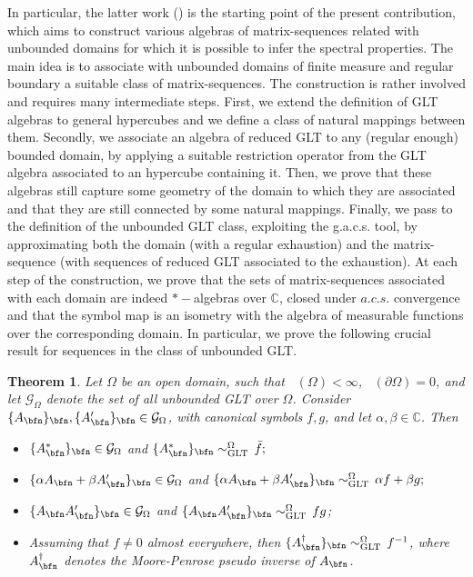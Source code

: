 \documentclass{amsart}
\newtheorem{thm}{Theorem}[section]
\DeclareMathOperator{\Ld}{\mathcal{L}^d}
\begin{document}
In particular, the latter work (\cite{gacs}) is the starting point of the present contribution, which aims to construct various algebras of matrix-sequences related with unbounded domains for which it is possible to infer the spectral properties. The main idea is to associate with unbounded domains of finite measure and regular boundary a suitable class of matrix-sequences. The construction is rather involved and requires many intermediate steps. First, we extend the definition of GLT algebras to general hypercubes and we define a class of natural mappings between them. Secondly, we associate an algebra of reduced GLT to any (regular enough) bounded domain, by applying a suitable restriction operator from the GLT algebra associated to an hypercube containing it. Then, we prove that these algebras still capture some geometry of the domain to which they are associated and that they are still connected by some natural mappings. Finally, we pass to the definition of the unbounded GLT class, exploiting the g.a.c.s. tool, by approximating both the domain (with a regular exhaustion) and the matrix-sequence (with sequences of reduced GLT associated to the exhaustion). 
At each step of the construction, we prove that the sets of matrix-sequences associated with each domain are indeed $*-$algebras over $\mathbb{C}$, closed under $a.c.s.$ convergence and that the symbol map is an isometry with the algebra of measurable functions over the corresponding domain.
In particular, we prove the following crucial result for sequences in the class of unbounded GLT.
\begin{thm}\label{main_thm_intro}
    Let $\Omega$ be an open domain, such that $\Ld(\Omega)<\infty$, $\Ld(\partial\Omega)=0$, and let $\mathcal{G}_{\Omega}$ denote the set of all unbounded GLT over $\Omega$. Consider $\{A_\bfn\}_\bfn,\{A'_\bfn\}_\bfn\in\mathcal{G}_{\Omega}$, with canonical symbols $f,g$, and let $\alpha,\beta\in\mathbb{C}$. Then
\begin{itemize}
    \item[(i)]\label{main_item_i} $\{A_\bfn^*\}_\bfn\in\mathcal{G}_\Omega$ and $ \{A^*_{\bfn}\}_{\bfn}\sim_{\mathrm{GLT}}^{\Omega}\,\bar{f};$
    \item[(ii)]\label{main_item_ii} $\{\alpha A_\bfn+\beta A'_\bfn\}_\bfn\in\mathcal{G}_\Omega$ and $\{\alpha A_{\bfn}+\beta A'_\bfn\}_{\bfn}\sim_{\mathrm{GLT}}^{\Omega}\,\alpha f+\beta g;$
    \item[(iii)]\label{main_item_iii} $\{A_\bfn A'_\bfn\}_\bfn\in\mathcal{G}_\Omega$ and $\{A_{\bfn} A'_\bfn\}_{\bfn}\sim_{\mathrm{GLT}}^{\Omega}\,fg$;
    \item[(iv)] Assuming that $f\neq 0$ almost everywhere, then $\{A_\bfn^{\dagger}\}_\bfn \sim_{\mathrm{GLT}}^{\Omega}\,f^{-1}$, where $A_\bfn^{\dagger}$ denotes the Moore-Penrose pseudo inverse of $A_{\bfn}$.
\end{itemize}
\end{thm}
\end{document}

